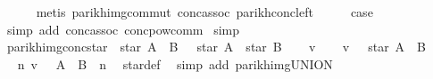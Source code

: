 \begin{isabellebody}
\ \ \ \ \isamarkupfalse%
\ {\isacharparenleft}{\kern0pt}metis\ parikh{\isacharunderscore}{\kern0pt}img{\isacharunderscore}{\kern0pt}commut\ conc{\isacharunderscore}{\kern0pt}assoc\ parikh{\isacharunderscore}{\kern0pt}conc{\isacharunderscore}{\kern0pt}left{\isacharparenright}{\kern0pt}\isanewline
\ \ \isamarkupfalse%
\ \isamarkupfalse%
\ {\isacharquery}{\kern0pt}case\ \isamarkupfalse%
\ {\isacharparenleft}{\kern0pt}simp\ add{\isacharcolon}{\kern0pt}\ conc{\isacharunderscore}{\kern0pt}assoc\ conc{\isacharunderscore}{\kern0pt}pow{\isacharunderscore}{\kern0pt}comm{\isacharparenright}{\kern0pt}\isanewline
{}\isamarkupfalse%
\ simp%
\endisatagproof
{\isafoldproof}%
%
\isadelimproof
\isanewline
%
\endisadelimproof
\isanewline
{}\isamarkupfalse%
\ parikh{\isacharunderscore}{\kern0pt}img{\isacharunderscore}{\kern0pt}conc{\isacharunderscore}{\kern0pt}star{\isacharcolon}{\kern0pt}\ {\isachardoublequoteopen}{\isasymPsi}\ {\isacharparenleft}{\kern0pt}star\ {\isacharparenleft}{\kern0pt}A\ {\isacharat}{\kern0pt}{\isacharat}{\kern0pt}\ B{\isacharparenright}{\kern0pt}{\isacharparenright}{\kern0pt}\ {\isasymsubseteq}\ {\isasymPsi}\ {\isacharparenleft}{\kern0pt}star\ A\ {\isacharat}{\kern0pt}{\isacharat}{\kern0pt}\ star\ B{\isacharparenright}{\kern0pt}{\isachardoublequoteclose}\isanewline
%
\isadelimproof
%
\endisadelimproof
%
\isatagproof
{}\isamarkupfalse%
\isanewline
\ \ \isamarkupfalse%
\ v\isanewline
\ \ \isamarkupfalse%
\ {\isachardoublequoteopen}v\ {\isasymin}\ {\isasymPsi}\ {\isacharparenleft}{\kern0pt}star\ {\isacharparenleft}{\kern0pt}A\ {\isacharat}{\kern0pt}{\isacharat}{\kern0pt}\ B{\isacharparenright}{\kern0pt}{\isacharparenright}{\kern0pt}{\isachardoublequoteclose}\isanewline
\ \ \isamarkupfalse%
\ \isamarkupfalse%
\ {\isachardoublequoteopen}{\isasymexists}n{\isachardot}{\kern0pt}\ v\ {\isasymin}\ {\isasymPsi}\ {\isacharparenleft}{\kern0pt}{\isacharparenleft}{\kern0pt}A\ {\isacharat}{\kern0pt}{\isacharat}{\kern0pt}\ B{\isacharparenright}{\kern0pt}\ {\isacharcircum}{\kern0pt}{\isacharcircum}{\kern0pt}\ n{\isacharparenright}{\kern0pt}{\isachardoublequoteclose}\ \isamarkupfalse%
\ star{\isacharunderscore}{\kern0pt}def\ \isamarkupfalse%
\ {\isacharparenleft}{\kern0pt}simp\ add{\isacharcolon}{\kern0pt}\ parikh{\isacharunderscore}{\kern0pt}img{\isacharunderscore}{\kern0pt}UNION{\isacharparenright}{\kern0pt}\isanewline

\end{isabellebody}
